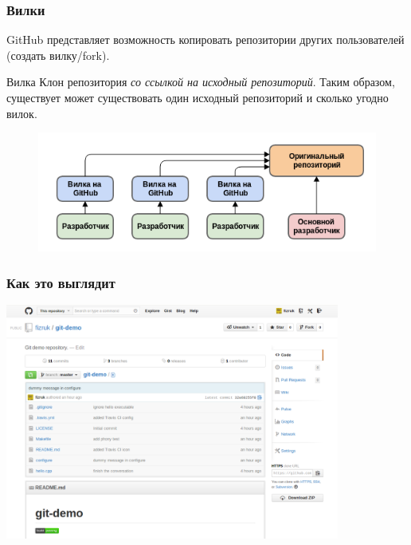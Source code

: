 \documentclass{beamer}
\begin{document}
\begin{frame}
  \frametitle{Вилки}
  GitHub представляет возможность копировать репозитории других пользователей (создать вилку/fork).

  \begin{block}{Вилка}
    Клон репозитория {\it со ссылкой на исходный репозиторий}. Таким образом,
    существует может существовать один исходный репозиторий и сколько угодно вилок.
  \end{block}

  \begin{figure}
    \includegraphics[width=12cm]{images/github-workflow.png}
  \end{figure}
\end{frame}

\begin{frame}
  \frametitle{Как это выглядит}
  \includegraphics[width=11cm]{images/github-git-demo.png}
\end{frame}
\end{document}
